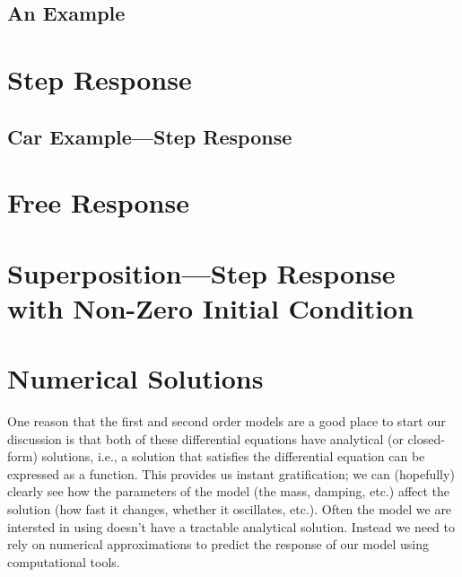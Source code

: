 
\subsection{An Example}


\section{Step Response}\label{s:firststep}

\subsection{Car Example---Step Response}


\section{Free Response}


\section{Superposition---Step Response with Non-Zero Initial Condition}









\section{Numerical Solutions}
One reason that the first and second order models are a good place to start our discussion is that both of these differential equations have analytical (or closed-form) solutions, i.e., a solution that satisfies the differential equation can be expressed as a function.  This provides us instant gratification; we can (hopefully) clearly see how the parameters of the model (the mass, damping, etc.) affect the solution (how fast it changes, whether it oscillates, etc.).   Often the model we are intersted in using doesn't have a tractable analytical solution.  Instead we need to rely on numerical approximations to predict the response of our model using computational tools.


